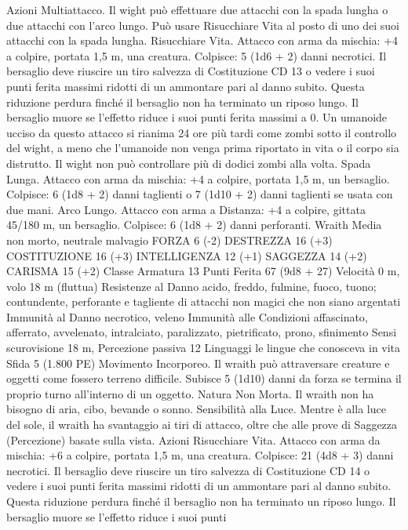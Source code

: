 \begin{multicols}{2}
Azioni
Multiattacco. Il wight può effettuare due attacchi con la spada
lungha o due attacchi con l’arco lungo. Può usare Risucchiare
Vita al posto di uno dei suoi attacchi con la spada lungha.
Risucchiare Vita. Attacco con arma da mischia: +4 a colpire,
portata 1,5 m, una creatura.
Colpisce: 5 (1d6 + 2) danni necrotici. Il bersaglio deve riuscire
un tiro salvezza di Costituzione CD 13 o vedere i suoi punti
ferita massimi ridotti di un ammontare pari al danno subito.
Questa riduzione perdura finché il bersaglio non ha terminato un
riposo lungo. Il bersaglio muore se l’effetto riduce i suoi punti
ferita massimi a 0.
Un umanoide ucciso da questo attacco si rianima 24 ore più tardi
come zombi sotto il controllo del wight, a meno che l’umanoide
non venga prima riportato in vita o il corpo sia distrutto. Il wight
non può controllare più di dodici zombi alla volta.
Spada Lunga. Attacco con arma da mischia: +4 a colpire,
portata 1,5 m, un bersaglio.
Colpisce: 6 (1d8 + 2) danni taglienti o 7 (1d10 + 2) danni
taglienti se usata con due mani.
Arco Lungo. Attacco con arma a Distanza: +4 a colpire, gittata
45/180 m, un bersaglio.
Colpisce: 6 (1d8 + 2) danni perforanti.
Wraith
Media non morto, neutrale malvagio
FORZA 6 (-2)
DESTREZZA 16 (+3)
COSTITUZIONE 16 (+3)
INTELLIGENZA 12 (+1)
SAGGEZZA 14 (+2)
CARISMA 15 (+2)
Classe Armatura 13
Punti Ferita 67 (9d8 + 27)
Velocità 0 m, volo 18 m (fluttua)
Resistenze al Danno acido, freddo, fulmine, fuoco, tuono;
contundente, perforante e tagliente di attacchi non magici che
non siano argentati
Immunità al Danno necrotico, veleno
Immunità alle Condizioni affascinato, afferrato, avvelenato,
intralciato, paralizzato, pietrificato, prono, sfinimento
Sensi scurovisione 18 m, Percezione passiva 12
Linguaggi le lingue che conosceva in vita
Sfida 5 (1.800 PE)
Movimento Incorporeo. Il wraith può attraversare creature e
oggetti come fossero terreno difficile. Subisce 5 (1d10) danni da
forza se termina il proprio turno all’interno di un oggetto.
Natura Non Morta. Il wraith non ha bisogno di aria, cibo,
bevande o sonno.
Sensibilità alla Luce. Mentre è alla luce del sole, il wraith ha
svantaggio ai tiri di attacco, oltre che alle prove di Saggezza
(Percezione) basate sulla vista.
Azioni
Risucchiare Vita. Attacco con arma da mischia: +6 a colpire,
portata 1,5 m, una creatura.
Colpisce: 21 (4d8 + 3) danni necrotici. Il bersaglio deve riuscire
un tiro salvezza di Costituzione CD 14 o vedere i suoi punti
ferita massimi ridotti di un ammontare pari al danno subito.
Questa riduzione perdura finché il bersaglio non ha terminato un
riposo lungo. Il bersaglio muore se l’effetto riduce i suoi punti

\end{multicols}
